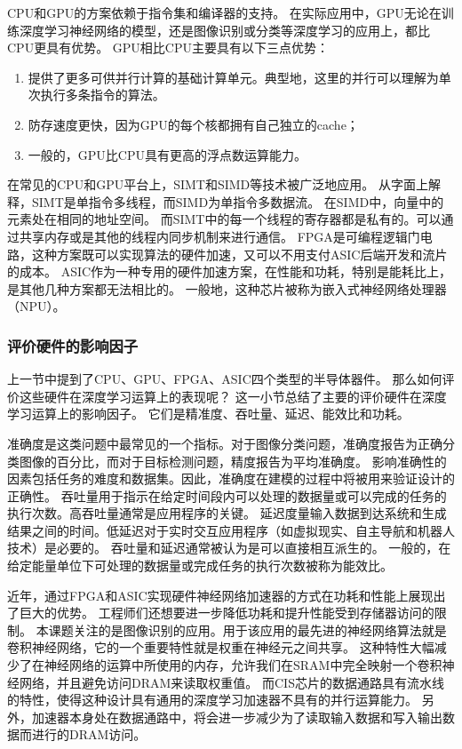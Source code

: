 CPU和GPU的方案依赖于指令集和编译器的支持。
在实际应用中，GPU无论在训练深度学习神经网络的模型，还是图像识别或分类等深度学习的应用上，都比CPU更具有优势。
GPU相比CPU主要具有以下三点优势：
\begin{enumerate}
    \item 提供了更多可供并行计算的基础计算单元。典型地，这里的并行可以理解为单次执行多条指令的算法。
    \item 防存速度更快，因为GPU的每个核都拥有自己独立的cache；
    \item 一般的，GPU比CPU具有更高的浮点数运算能力。
\end{enumerate}
在常见的CPU和GPU平台上，SIMT和SIMD等技术被广泛地应用。
从字面上解释，SIMT是单指令多线程，而SIMD为单指令多数据流。
在SIMD中，向量中的元素处在相同的地址空间。
而SIMT中的每一个线程的寄存器都是私有的。可以通过共享内存或是其他的线程内同步机制来进行通信。
FPGA是可编程逻辑门电路，这种方案既可以实现算法的硬件加速，又可以不用支付ASIC后端开发和流片的成本。
ASIC作为一种专用的硬件加速方案，在性能和功耗，特别是能耗比上，是其他几种方案都无法相比的。
一般地，这种芯片被称为嵌入式神经网络处理器（NPU）。


\subsubsection{评价硬件的影响因子}
上一节中提到了CPU、GPU、FPGA、ASIC四个类型的半导体器件。
那么如何评价这些硬件在深度学习运算上的表现呢？
这一小节总结了主要的评价硬件在深度学习运算上的影响因子。
它们是精准度、吞吐量、延迟、能效比和功耗。

准确度是这类问题中最常见的一个指标。对于图像分类问题，准确度报告为正确分类图像的百分比，而对于目标检测问题，精度报告为平均准确度。
影响准确性的因素包括任务的难度和数据集。因此，准确度在建模的过程中将被用来验证设计的正确性。
吞吐量用于指示在给定时间段内可以处理的数据量或可以完成的任务的执行次数。高吞吐量通常是应用程序的关键。
延迟度量输入数据到达系统和生成结果之间的时间。低延迟对于实时交互应用程序（如虚拟现实、自主导航和机器人技术）是必要的。
吞吐量和延迟通常被认为是可以直接相互派生的。
一般的，在给定能量单位下可处理的数据量或完成任务的执行次数被称为能效比。


近年，通过FPGA和ASIC实现硬件神经网络加速器的方式在功耗和性能上展现出了巨大的优势。
工程师们还想要进一步降低功耗和提升性能受到存储器访问的限制。
本课题关注的是图像识别的应用。用于该应用的最先进的神经网络算法就是卷积神经网络，它的一个重要特性就是权重在神经元之间共享。
这种特性大幅减少了在神经网络的运算中所使用的内存，允许我们在SRAM中完全映射一个卷积神经网络，并且避免访问DRAM来读取权重值。
而CIS芯片的数据通路具有流水线的特性，使得这种设计具有通用的深度学习加速器不具有的并行运算能力。
另外，加速器本身处在数据通路中，将会进一步减少为了读取输入数据和写入输出数据而进行的DRAM访问。   

